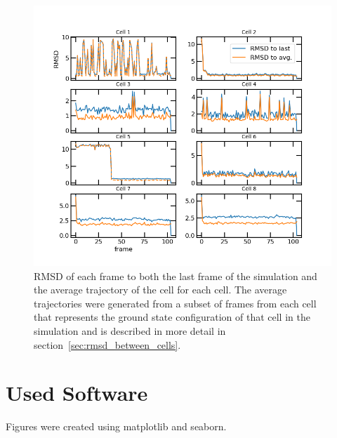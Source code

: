 \documentclass[a4paper,11pt,oneside,final,english,toc=bib]{scrbook}
\begin{document}
\begin{figure}[ht]
\centering
  \includegraphics[width=\textwidth+0.5cm]{rmsd_last_vs_avg.png}
  \caption{RMSD of each frame to both the last frame of the simulation and the average trajectory of the cell for each cell. The average trajectories were generated from a subset of frames from each cell that represents the ground state configuration of that cell in the simulation and is described in more detail in section~\ref{sec:rmsd_between_cells}.}
  \label{fig:rmsd_last_vs_avg}
\end{figure}


\chapter{Used Software} %
\label{cha:used_software}

Figures were created using matplotlib\cite{j_d_hunter_matplotlib_2007} and seaborn\cite{waskom_seaborn_2021}.
\end{document}
